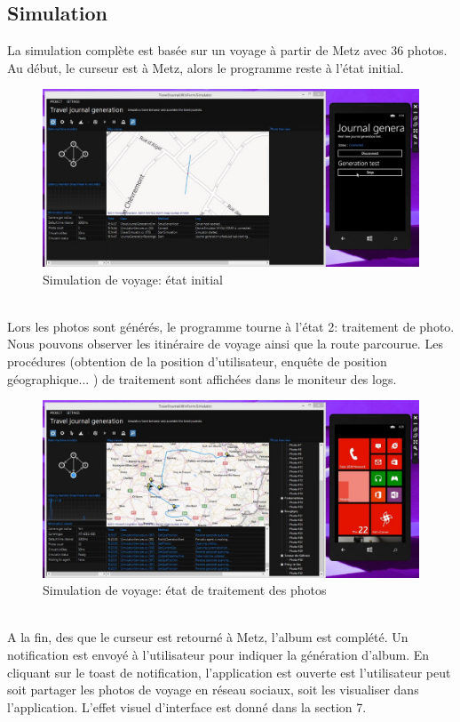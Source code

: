 \documentclass{article}
\begin{document}
\vspace{0.2 cm}
\subsection{\Large Simulation}

La simulation complète est basée sur un voyage à partir de Metz avec 36 photos. Au début, le curseur est à Metz, alors le programme reste à l'état initial. 
\begin{figure}[h!]
\centering
\includegraphics[width=150mm]{SIMU1.jpg}
\caption{Simulation de voyage: état initial}
\end{figure}
\ \\Lors les photos sont générés, le programme tourne à l'état 2: traitement de photo. Nous pouvons observer les itinéraire de voyage ainsi que la route parcourue. Les procédures (obtention de la position d'utilisateur, enquête de position géographique... ) de traitement sont affichées  dans le moniteur des logs.
\begin{figure}[h!]
\centering
\includegraphics[width=150mm]{SIMU2.jpg}
\caption{Simulation de voyage: état de traitement des photos}
\end{figure}
\ \\A la fin, des que le curseur est retourné à Metz, l'album est complété. Un notification est envoyé à l'utilisateur pour indiquer la génération d'album.  En cliquant sur le toast de notification, l'application est ouverte est l'utilisateur peut soit partager les photos de voyage en réseau sociaux, soit les visualiser dans l'application. L'effet visuel d'interface est donné dans la section 7.
\end{document}
